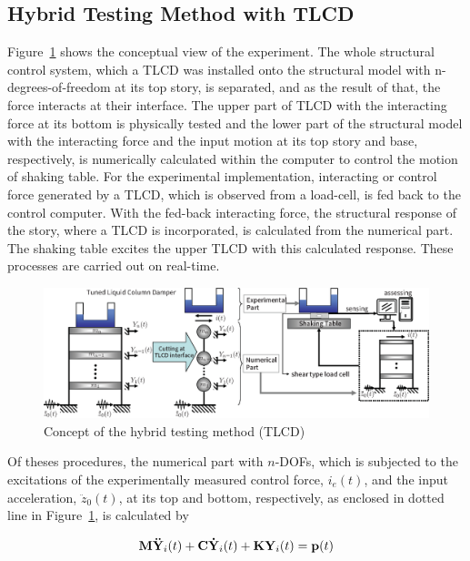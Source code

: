 \subsection{Hybrid Testing Method with TLCD}
Figure~\ref{fig:4-1} shows the conceptual view of the experiment. The whole structural control system, which a TLCD was installed onto the structural model with n-degrees-of-freedom at its top story, is separated, and as the result of that, the force interacts at their interface. The upper part of TLCD with the interacting force at its bottom is physically tested and the lower part of the structural model with the interacting force and the input motion at its top story and base, respectively, is numerically calculated within the computer to control the motion of shaking table. For the experimental implementation, interacting or control force generated by a TLCD, which is observed from a load-cell, is fed back to the control computer. With the fed-back interacting force, the structural response of the story, where a TLCD is incorporated, is calculated from the numerical part. The shaking table excites the upper TLCD with this calculated response. These processes are carried out on real-time.

\begin{figure}[ht]
\centering
\includegraphics[width=1\textwidth] {figure/4-1.eps}
\caption{Concept of the hybrid testing method (TLCD)}
\label{fig:4-1}
\end{figure}

Of theses procedures, the numerical part with $n$-DOFs, which is subjected to the excitations of the experimentally measured control force, $i_{e}(t)$, and the input acceleration, $\ddot{z}_{0}(t)$, at its top and bottom, respectively, as enclosed in dotted line in Figure~\ref{fig:4-1}, is calculated by

\begin{equation}\label{eq:4-1}
\mathbf{M}\mathbf{\ddot{Y}}_{i}(t)+\mathbf{C}\mathbf{\dot{Y}}_{i}(t)+\mathbf{K}\mathbf{Y}_{i}(t)=\mathbf{p}(t)
\end{equation}

